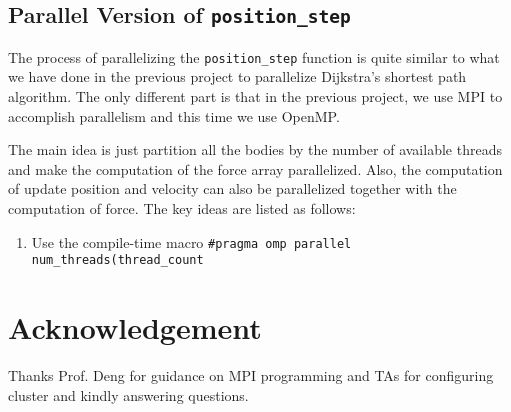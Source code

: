 \documentclass{article}
\begin{document}
\subsection{Parallel Version of \texttt{position\_step}}
The process of parallelizing the \verb|position_step| function is quite
similar to what we have done in the previous project to parallelize
Dijkstra's shortest path algorithm. The only different part is that in the
previous project, we use MPI to accomplish parallelism and this time we use
OpenMP.

The main idea is just partition all the bodies by the number of available
threads and make the computation of the force array parallelized. Also, the
computation of update position and velocity can also be parallelized
together with the computation of force. The key ideas are listed as follows:
\begin{enumerate}
	\item Use the compile-time macro \verb|#pragma omp parallel num_threads(thread_count|
\end{enumerate}














\section*{Acknowledgement}
Thanks Prof. Deng for guidance on MPI programming and TAs for configuring cluster and kindly answering questions.
\end{document}
